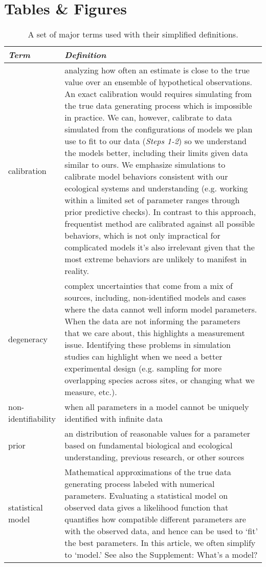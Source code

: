 \documentclass[11pt]{article}
\begin{document}
\section*{Tables \& Figures}


\begin{table}
\caption{A set of major terms used with their simplified definitions.}
\begin{tabular}{ p{3 cm}  p{13 cm} }  \hline \hline
 \emph{Term}   & \emph{Definition}\\ 
\hline \hline
calibration & analyzing how often an estimate is close to the true value over an ensemble of hypothetical observations.  An exact calibration would requires simulating from the true data generating process which is impossible in practice.  We can, however, calibrate to data simulated from the configurations of models we plan use to fit to our data (\emph{Steps 1-2}) so we understand the models better, including their limits given data similar to ours. We emphasize simulations to calibrate model behaviors consistent with our ecological systems and understanding (e.g. working within a limited set of parameter ranges through prior predictive checks). In contrast to this approach, frequentist method are calibrated against all possible behaviors, which is not only impractical for complicated models it’s also irrelevant given that the most extreme behaviors are unlikely to manifest in reality. \\\hline
degeneracy & complex uncertainties that come from a mix of sources, including, non-identified models and cases where the data cannot well inform model parameters. When the data are not informing the parameters that we care about, this highlights a measurement issue. Identifying these problems in simulation studies can highlight when we need a better experimental design (e.g. sampling for more overlapping species across sites, or changing what we measure, etc.).  \\\hline
non-identifiability & when all parameters in a model cannot be uniquely identified with infinite data \\\hline
prior & an distribution of reasonable values for a parameter based on fundamental biological and ecological understanding, previous research, or other sources \\\hline
statistical model & Mathematical approximations of the true data generating process labeled with numerical parameters.  Evaluating a statistical model on observed data gives a likelihood function that quantifies how compatible different parameters are with the observed data, and hence can be used to `fit' the best parameters. In this article, we often simplify to `model.' See also the Supplement: What's a model? \\\hline

\end{tabular}
\end{table}
\end{document}
